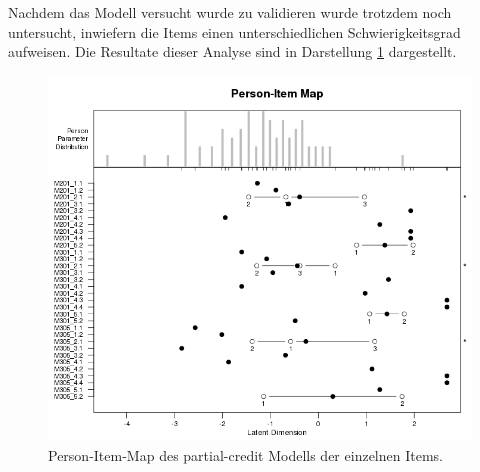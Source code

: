 Nachdem das Modell versucht wurde zu validieren wurde trotzdem noch untersucht, inwiefern die Items einen unterschiedlichen Schwierigkeitsgrad aufweisen. Die Resultate dieser Analyse sind in Darstellung \ref{fig:PIM} dargestellt.



\begin{figure}[htp]
   \centering
   \includegraphics[width=1.0\linewidth]{graphics/PersonItemMap.png}
   \caption{Person-Item-Map des partial-credit Modells der einzelnen Items.}
   \label{fig:PIM}
\end{figure}

